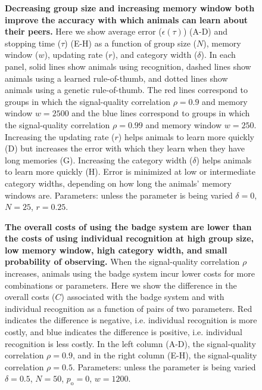 \begin{figure}
\caption{\sffamily\small\textbf{Decreasing group size and increasing memory window both improve the accuracy with which animals can learn about their peers.} Here we show average error ($\epsilon(\tau)$) (A-D) and stopping time ($\tau$) (E-H) as a function of group size ($N$), memory window ($w$), updating rate ($r$), and category width ($\delta$). In each panel, solid lines show animals using recognition, dashed lines show animals using a learned rule-of-thumb, and dotted lines show animals using a genetic rule-of-thumb. The red lines correspond to groups in which the signal-quality correlation $\rho=0.9$ and memory window $w=2500$ and the blue lines correspond to groups in which the signal-quality correlation $\rho=0.99$ and memory window $w=250$. Increasing the updating rate ($r$) helps animals to learn more quickly (D) but increases the error with which they learn when they have long memories (G). Increasing the category width ($\delta$) helps animals to learn more quickly (H). Error is minimized at low or intermediate category widths, depending on how long the animals' memory windows are. Parameters: unless the parameter is being varied $\delta = 0$, $N=25$, $r=0.25$.}
\label{parameters}
\end{figure}

\begin{figure}
\caption{\sffamily\small\textbf{}}
\label{optimization}
\end{figure}

\begin{figure}
\caption{\sffamily\small\textbf{}}
\label{comp}
\end{figure}

\begin{figure}
\caption{\sffamily\small\textbf{The overall costs of using the badge system are lower than the costs of using individual recognition at high group size, low memory window, high category width, and small probability of observing.} When the signal-quality correlation $\rho$ increases, animals using the badge system incur lower costs for more combinations or parameters. Here we show the difference in the overall costs ($C$) associated with the badge system and with individual recognition as a function of pairs of two parameters. Red indicates the difference is negative, i.e. individual recognition is more costly, and blue indicates the difference is positive, i.e. individual recognition is less costly.  In the left column (A-D), the signal-quality correlation $\rho=0.9$, and in the right column (E-H), the signal-quality correlation $\rho=0.5$. Parameters: unless the parameter is being varied $\delta = 0.5$, $N=50$, $p_\text{o}=0$, $w=1200$.}
\label{comparison}
\end{figure}


